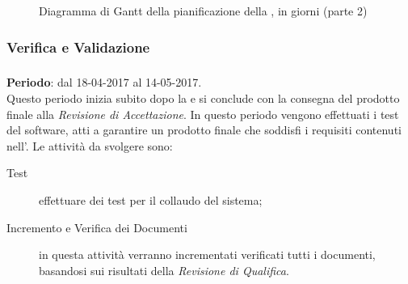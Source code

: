 \begin{figure}[H]
\label{tab:ganttpa1}
\caption{Diagramma di Gantt della pianificazione della \PDC, in giorni (parte 2)}
\end{figure}


	\subsubsection{Verifica e Validazione} \label{sec:VV}

	\subsubsection{\VV} \label{sec:VV}
	\textbf{Periodo}: dal 18-04-2017 al 14-05-2017.
	\\ Questo periodo inizia subito dopo la \PDC{} e si conclude con la consegna del prodotto finale alla \emph{Revisione di Accettazione}. In questo periodo vengono effettuati i test del software, atti a garantire un prodotto finale che soddisfi i requisiti contenuti nell'\AR. Le attività da svolgere sono:
	\begin{description}
		\item[Test] effettuare dei test per il collaudo del sistema;
		\item[Incremento e Verifica dei Documenti] in questa attività verranno incrementati verificati tutti i documenti, basandosi sui risultati della \emph{Revisione di Qualifica}.
	\end{description}		
	
